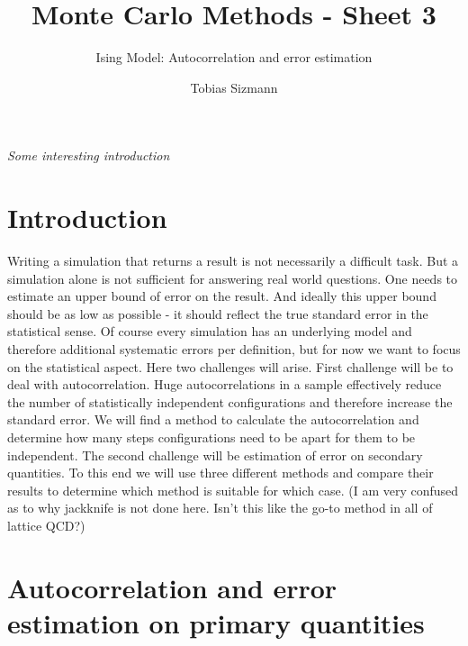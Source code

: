 \documentclass[11pt, a4paper]{scrartcl}
\title{Monte Carlo Methods - Sheet 3}
\subtitle{Ising Model: Autocorrelation and error estimation}
\author{Tobias Sizmann}
\begin{document}
\maketitle
\textit{Some interesting introduction}
\section{Introduction}
    Writing a simulation that returns a result is not necessarily a difficult task. But a simulation alone is not sufficient for answering real world questions. One needs to estimate an upper bound of error on the result. And ideally this upper bound should be as low as possible - it should reflect the true standard error in the statistical sense. Of course every simulation has an underlying model and therefore additional systematic errors per definition, but for now we want to focus on the statistical aspect. Here two challenges will arise. First challenge will be to deal with autocorrelation. Huge autocorrelations in a sample effectively reduce the number of statistically independent configurations and therefore increase the standard error. We will find a method to calculate the autocorrelation and determine how many steps configurations need to be apart for them to be independent. The second challenge will be estimation of error on secondary quantities. To this end we will use three different methods and compare their results to determine which method is suitable for which case. (I am very confused as to why jackknife is not done here. Isn't this like the go-to method in all of lattice QCD?)
\section{Autocorrelation and error estimation on primary quantities}
\end{document}
